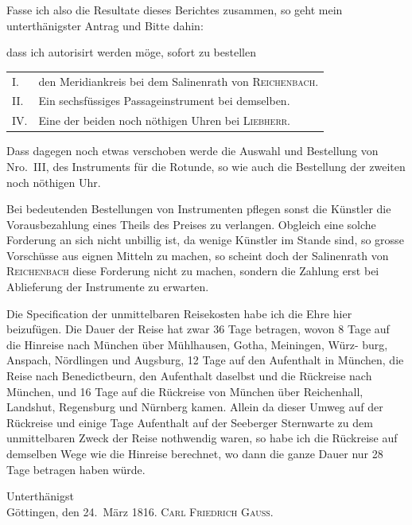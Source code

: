 \documentclass[12pt,a4paper]{article}
\theoremstyle{plain}
\theoremstyle{definition}
\theoremstyle{remark}
\begin{document}
Fasse ich also die Resultate dieses Berichtes zusammen, so geht mein
unterth\"{a}nigster Antrag und Bitte dahin:

dass ich autorisirt werden m\"{o}ge, sofort zu bestellen

\begin{tabular}{ll}
I. & den Meridiankreis bei dem Salinenrath von \textsc{Reichenbach}. \\
II. & Ein sechsf\"{u}ssiges Passageinstrument bei demselben. \\
IV. & Eine der beiden noch n\"{o}thigen Uhren bei \textsc{Liebherr}.
\end{tabular}

Dass dagegen noch etwas verschoben werde die Auswahl und Bestellung
von Nro.\ III, des Instruments f\"{u}r die Rotunde, so wie auch die Bestellung
der zweiten noch n\"{o}thigen Uhr.

Bei bedeutenden Bestellungen von Instrumenten pflegen sonst die K\"{u}nstler
die Vorausbezahlung eines Theils des Preises zu verlangen. Obgleich eine
solche Forderung an sich nicht unbillig ist, da wenige K\"{u}nstler im Stande
sind, so grosse Vorsch\"{u}sse aus eignen Mitteln zu machen, so scheint doch der
Salinenrath von \textsc{Reichenbach} diese Forderung nicht zu machen, sondern die
Zahlung erst bei Ablieferung der Instrumente zu erwarten.

\medskip
Die Specification der unmittelbaren Reisekosten habe ich die Ehre hier
beizuf\"{u}gen. Die Dauer der Reise hat zwar 36 Tage betragen, wovon 8 Tage
auf die Hinreise nach M\"{u}nchen \"{u}ber M\"{u}hlhausen, Gotha, Meiningen, W\"{u}rz-
burg, Anspach, N\"{o}rdlingen und Augsburg, 12 Tage auf den Aufenthalt in
M\"{u}nchen, die Reise nach Benedictbeurn, den Aufenthalt daselbst und die
R\"{u}ckreise nach M\"{u}nchen, und 16 Tage auf die R\"{u}ckreise von M\"{u}nchen \"{u}ber
Reichenhall, Landshut, Regensburg und N\"{u}rnberg kamen. Allein da dieser
Umweg auf der R\"{u}ckreise und einige Tage Aufenthalt auf der Seeberger
Sternwarte zu dem unmittelbaren Zweck der Reise nothwendig waren,
so habe ich die R\"{u}ckreise auf demselben Wege wie die Hinreise berechnet,
wo dann die ganze Dauer nur 28 Tage betragen haben w\"{u}rde.

\begin{flushright}
Unterth\"{a}nigst\\[0.3em]
G\"{o}ttingen, den 24.\ M\"{a}rz 1816. \hspace{2em} \textsc{Carl Friedrich Gauss}.
\end{flushright}
\end{document}
